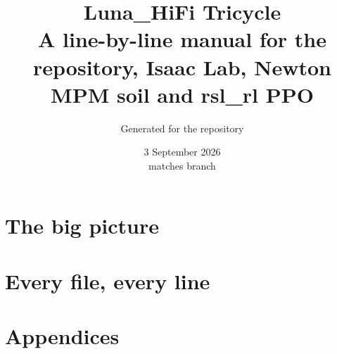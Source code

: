\documentclass[11pt,a4paper,oneside]{report}
\title{\Huge\bfseries Luna\_HiFi Tricycle\\[6pt]
  \Large A line-by-line manual for the repository, Isaac Lab, Newton MPM soil and rsl\_rl PPO}
\author{Generated for the \code{hvnsel/newtonRL} repository}
\date{3 September 2026 \\[4pt] \small matches branch \code{claude/luna-hifi-isaac-runbook-imdm7y}}
\begin{document}
\maketitle
\thispagestyle{empty}

\clearpage
\tableofcontents
\clearpage


\part{The big picture}





\part{Every file, every line}









\appendix
\part{Appendices}

\end{document}
